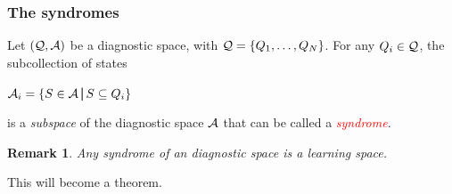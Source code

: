 \documentclass{beamer}
\newtheorem{remark}[theorem]{Remark}
\def\tl{\vskip 2mm}
\def\SB{\subseteq}
\def\AAA{{\cal A}}
\def\QQQ{{\cal Q}}
\def\st{{\;\vrule height8pt width0.7pt depth2.5pt\;}}
\def\rtxt#1{\textcolor{red}{#1}}
\begin{document}
  \begin{frame}
  \frametitle{The syndromes}
   \center
\begin{minipage}{10cm} 
 \begin{definition} Let $(\QQQ,\AAA)$ be a diagnostic space, with $\QQQ=\{Q_1,\ldots,Q_N\}$. For any $Q_i\in\QQQ$, the subcollection of states
 \tl
 \centerline{$\AAA_i=\{S\in\AAA\st S\SB Q_i\}$}
 \tl
  is a {\sl subspace} of the diagnostic space $\AAA$ that can be called a \rtxt{\sl syndrome}.
  \end{definition}
  \tl
\begin{remark} {\sl Any syndrome of an diagnostic space is a learning space.}
  \end{remark} 
  This will become a theorem.
\end{minipage}
\end{frame}
\end{document}

